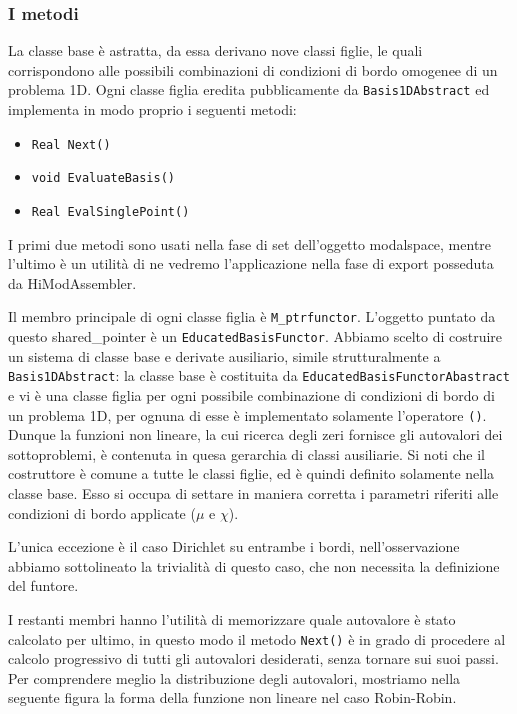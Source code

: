 \subsubsection{I metodi}

La classe base \`e astratta, da essa derivano nove classi figlie, le quali corrispondono alle possibili combinazioni di condizioni di bordo omogenee di un problema 1D. Ogni classe figlia eredita pubblicamente da \texttt{Basis1DAbstract} ed implementa in modo proprio i seguenti metodi:

\begin{itemize}
\item \texttt{Real Next()} 
\item \texttt{void EvaluateBasis()}
\item \texttt{Real EvalSinglePoint()}
\end{itemize}

I primi due metodi sono usati nella fase di set dell'oggetto modalspace, mentre l'ultimo \`e un utilit\`a di ne vedremo l'applicazione nella fase di export posseduta da HiModAssembler. 

Il membro principale di ogni classe figlia \`e \texttt{M\_ptrfunctor}. L'oggetto puntato da questo shared\_pointer  \`e un \texttt{EducatedBasisFunctor}. Abbiamo scelto di costruire un sistema di classe base e derivate ausiliario, simile strutturalmente a \texttt{Basis1DAbstract}: la classe base \`e costituita da \texttt{EducatedBasisFunctorAbastract} e vi \`e una classe figlia per ogni possibile combinazione di condizioni di bordo di un problema 1D, per ognuna di esse \`e implementato solamente l'operatore \texttt{()}. Dunque la funzioni non lineare, la cui ricerca degli zeri fornisce gli autovalori dei sottoproblemi, \`e contenuta in quesa gerarchia di classi ausiliarie. Si noti che il costruttore \`e comune a tutte le classi figlie, ed \`e quindi definito solamente nella classe base. Esso si occupa di settare in maniera corretta i parametri riferiti alle condizioni di bordo applicate ($\mu$ e $\chi$). 

L'unica eccezione \`e il caso Dirichlet su entrambe i bordi, nell'osservazione abbiamo sottolineato la trivialit\`a di questo caso, che non necessita la definizione del funtore.

I restanti membri hanno l'utilit\`a di memorizzare quale autovalore \`e stato calcolato per ultimo, in questo modo il metodo \texttt{Next()} \`e in grado di procedere al calcolo progressivo di tutti gli autovalori desiderati, senza tornare sui suoi passi. Per comprendere meglio la distribuzione degli autovalori, mostriamo nella seguente figura la forma della funzione non lineare nel caso Robin-Robin.

